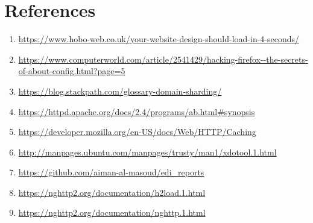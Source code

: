 \documentclass[a4paper,10pt]{article}
\begin{document}
\section{References}

\begin{enumerate}

\item \label{article1} \url{https://www.hobo-web.co.uk/your-website-design-should-load-in-4-seconds/} 

\item \label{article2} \url{https://www.computerworld.com/article/2541429/hacking-firefox--the-secrets-of-about-config.html?page=5} 

\item \label{article3} \url{https://blog.stackpath.com/glossary-domain-sharding/} 

\item \label{article4} \url{https://httpd.apache.org/docs/2.4/programs/ab.html#synopsis} 

\item \label{article5} \url{https://developer.mozilla.org/en-US/docs/Web/HTTP/Caching} 

\item \label{article6} \url{http://manpages.ubuntu.com/manpages/trusty/man1/xdotool.1.html} 

\item \label{article7} \url{https://github.com/aiman-al-masoud/edi_reports} 

\item \label{article8} \url{https://nghttp2.org/documentation/h2load.1.html} 

\item \label{article9} \url{https://nghttp2.org/documentation/nghttp.1.html} 


\end{enumerate}
\end{document}
